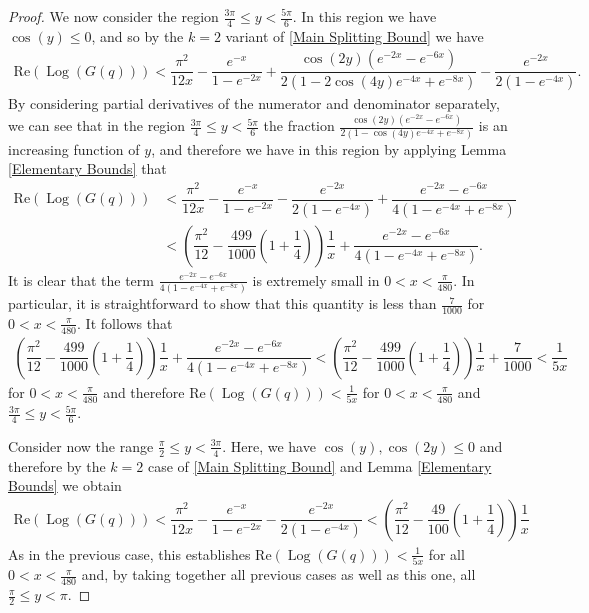\documentclass[11pt,reqno]{amsart}
\theoremstyle{definition}
\theoremstyle{plain}
\theoremstyle{named}
\DeclareMathOperator\Log{Log}
\numberwithin{equation}{section}
\theoremstyle{example}
\def\lp{\left(}
\def\rp{\right)}
\begin{document}
\begin{proof}
We now consider the region $\frac{3\pi}{4} \leq y < \frac{5\pi}{6}$. In this region we have $\cos\lp y \rp \leq 0$, and so by the $k = 2$ variant of \eqref{Main Splitting Bound} we have
\begin{align*}
    \mathrm{Re}\lp \Log\lp G(q) \rp \rp < \dfrac{\pi^2}{12x} - \dfrac{e^{-x}}{1 - e^{-2x}} + \dfrac{\cos\lp 2y \rp \lp e^{-2x} - e^{-6x} \rp}{2\lp 1 - 2 \cos\lp 4y \rp e^{-4x} + e^{-8x} \rp} - \dfrac{e^{-2x}}{2\lp 1 - e^{-4x} \rp}.
\end{align*}
By considering partial derivatives of the numerator and denominator separately, we can see that in the region $\frac{3\pi}{4} \leq y < \frac{5\pi}{6}$ the fraction $\frac{\cos\lp 2y \rp \lp e^{-2x} - e^{-6x} \rp}{2\lp 1 - \cos\lp 4y \rp e^{-4x} + e^{-8x} \rp}$ is an increasing function of $y$, and therefore we have in this region by applying Lemma \ref{Elementary Bounds} that
\begin{align*}
    \mathrm{Re}\lp \Log\lp G(q) \rp \rp &< \dfrac{\pi^2}{12x} - \dfrac{e^{-x}}{1 - e^{-2x}} - \dfrac{e^{-2x}}{2\lp 1 - e^{-4x} \rp} + \dfrac{e^{-2x} - e^{-6x}}{4\lp 1 - e^{-4x} + e^{-8x} \rp} \\ &< \lp \dfrac{\pi^2}{12} - \dfrac{499}{1000} \lp 1 + \dfrac{1}{4} \rp \rp \dfrac{1}{x} + \dfrac{e^{-2x} - e^{-6x}}{4\lp 1 - e^{-4x} + e^{-8x} \rp}.
\end{align*}
It is clear that the term $\frac{e^{-2x} - e^{-6x}}{4\lp 1 - e^{-4x} + e^{-8x} \rp}$ is extremely small in $0 < x < \frac{\pi}{480}$. In particular, it is straightforward to show that this quantity is less than $\frac{7}{1000}$ for $0 < x < \frac{\pi}{480}$. It follows that
\begin{align*}
	\lp \dfrac{\pi^2}{12} - \dfrac{499}{1000} \lp 1 + \dfrac{1}{4} \rp \rp \dfrac{1}{x} + \dfrac{e^{-2x} - e^{-6x}}{4\lp 1 - e^{-4x} + e^{-8x} \rp} < \lp \dfrac{\pi^2}{12} - \dfrac{499}{1000} \lp 1 + \dfrac{1}{4} \rp \rp \dfrac{1}{x} + \dfrac{7}{1000} <  \dfrac{1}{5x}
\end{align*}
for $0 < x < \frac{\pi}{480}$ and therefore $\mathrm{Re}\lp \Log\lp G(q) \rp \rp < \frac{1}{5x}$ for $0 < x < \frac{\pi}{480}$ and $\frac{3\pi}{4} \leq y < \frac{5\pi}{6}$.

Consider now the range $\frac{\pi}{2} \leq y < \frac{3\pi}{4}$. Here, we have $\cos\lp y \rp, \cos\lp 2y \rp \leq 0$ and therefore by the $k = 2$ case of \eqref{Main Splitting Bound} and Lemma \ref{Elementary Bounds} we obtain
\begin{align*}
    \mathrm{Re}\lp \Log\lp G(q) \rp \rp < \dfrac{\pi^2}{12x} - \dfrac{e^{-x}}{1 - e^{-2x}} - \dfrac{e^{-2x}}{2\lp 1 - e^{-4x} \rp} < \lp \dfrac{\pi^2}{12} - \dfrac{49}{100}\lp 1 + \dfrac{1}{4} \rp \rp \dfrac{1}{x}
\end{align*}
As in the previous case, this establishes $\mathrm{Re}\lp \Log\lp G(q) \rp \rp < \frac{1}{5x}$ for all $0 < x < \frac{\pi}{480}$ and, by taking together all previous cases as well as this one, all $\frac{\pi}{2} \leq y < \pi$.


\end{proof}
\end{document}
